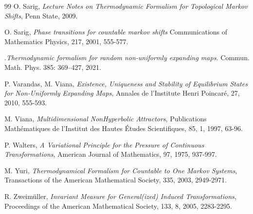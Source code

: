 \documentclass[12pt,a4paper]{amsart}
\theoremstyle{plain}
\begin{document}
\begin{thebibliography}{99}
	 {\sc O. Sarig}, {\it Lecture  Notes  on Thermodynamic Formalism for Topological Markov Shifts}, Penn State, 2009.
	
	 {\sc O. Sarig}, {\it Phase transitions for countable markov shifts} Communications of Mathematics Physics, 217, 2001, 555-577. 
	
	.{\it Thermodynamic formalism for random non-uniformly expanding maps.} Commun. Math. Phys. 385: 369--427, 2021.
	
	
	 {\sc P. Varandas, M. Viana}, {\it Existence, Uniqueness and Stability of Equilibrium States for Non-Uniformly Expanding Maps}, Annales de l'Institute Henri Poincar\' e, 27, 2010, 555-593.
	
	 {\sc M. Viana}, {\it Multidimensional NonHyperbolic Attractors},  Publications Math\' ematiques de l'Institut des Hautes \' Etudes Scientifiques, 85, 1, 1997, 63-96. 
	
	 {\sc P. Walters}, {\it A Variational Principle for the Pressure of Continuous Transformations},
	American Journal of Mathematics, 97, 1975, 937-997. 
	
	 {\sc M. Yuri}, {\it Thermodynamical Formalism for Countable to One Markov Systems}, Transactions of the American Mathematical Society, 335, 2003, 2949-2971.
	
	 {\sc R. Zweim\" uller}, {\it Invariant Measure for General(ized) Induced Transformations}, Proceedings of the American Mathematical Society, 133, 8, 2005, 2283-2295.
\end{thebibliography}
\end{document}
